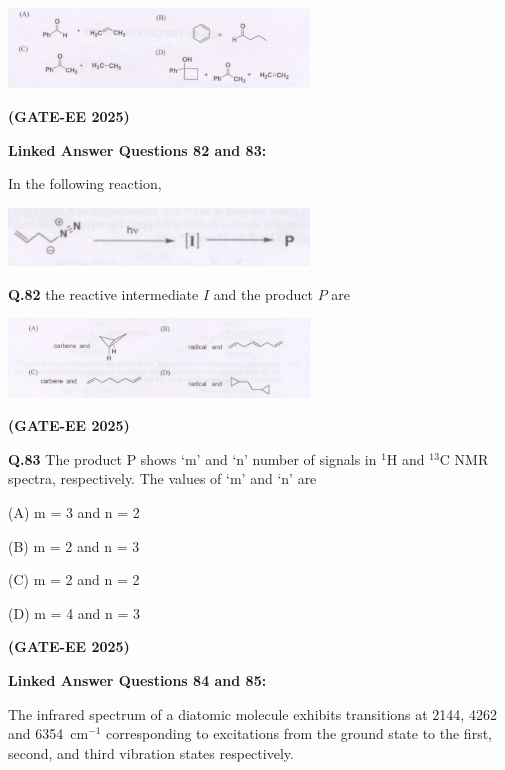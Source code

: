 \documentclass[12pt]{article}
\begin{document}
\begin{enumerate}
\begin{center}
\includegraphics[width=0.6\textwidth]{q81.png}
\end{center}   \textbf{(GATE-EE 2025)}


\textbf{Linked Answer Questions 82 and 83:}

In the following reaction,

\begin{center}
\includegraphics[width=0.6\textwidth]{q82 1.png}
\end{center}

\textbf{Q.82} the reactive intermediate $I$ and the product $P$ are

\begin{center}
\includegraphics[width=0.6\textwidth]{q82 2.png}
\end{center}   \textbf{(GATE-EE 2025)}


\textbf{Q.83} The product P shows ‘m’ and ‘n’ number of signals in $^1$H and $^{13}$C NMR spectra, respectively. The values of ‘m’ and ‘n’ are

\begin{choices}
\item[(A)]m = 3 and n = 2
\item[(B)] m = 2 and n = 3
\item[(C)]m = 2 and n = 2
\item[(D)] m = 4 and n = 3
\end{choices}   \textbf{(GATE-EE 2025)}


\textbf{Linked Answer Questions 84 and 85:}

The infrared spectrum of a diatomic molecule exhibits transitions at 2144, 4262 and 6354~cm$^{-1}$ 
corresponding to excitations from the ground state to the first, second, and third vibration states respectively.


\end{enumerate}
\end{document}
